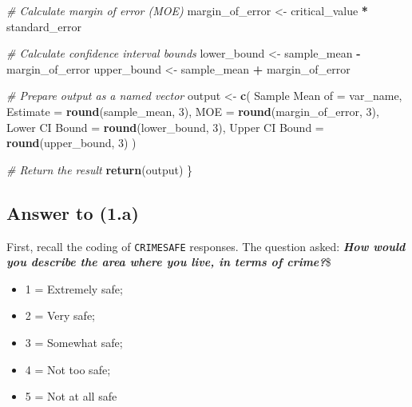 \documentclass[
  11pt,
]{article}
\newenvironment{Shaded}{\begin{snugshade}}{\end{snugshade}}
\newcommand{\AttributeTok}[1]{\textcolor[rgb]{0.13,0.29,0.53}{#1}}
\newcommand{\CommentTok}[1]{\textcolor[rgb]{0.56,0.35,0.01}{\textit{#1}}}
\newcommand{\DecValTok}[1]{\textcolor[rgb]{0.00,0.00,0.81}{#1}}
\newcommand{\FunctionTok}[1]{\textcolor[rgb]{0.13,0.29,0.53}{\textbf{#1}}}
\newcommand{\NormalTok}[1]{#1}
\newcommand{\OtherTok}[1]{\textcolor[rgb]{0.56,0.35,0.01}{#1}}
\newcommand{\SpecialCharTok}[1]{\textcolor[rgb]{0.81,0.36,0.00}{\textbf{#1}}}
\newcommand{\StringTok}[1]{\textcolor[rgb]{0.31,0.60,0.02}{#1}}
\providecommand{\tightlist}{%
  \setlength{\itemsep}{0pt}\setlength{\parskip}{0pt}}
\begin{document}
\begin{Shaded}
\begin{Highlighting}[]
  \CommentTok{\# Calculate margin of error (MOE)}
\NormalTok{  margin\_of\_error }\OtherTok{\textless{}{-}}\NormalTok{ critical\_value }\SpecialCharTok{*}\NormalTok{ standard\_error}
  
  \CommentTok{\# Calculate confidence interval bounds}
\NormalTok{  lower\_bound }\OtherTok{\textless{}{-}}\NormalTok{ sample\_mean }\SpecialCharTok{{-}}\NormalTok{ margin\_of\_error}
\NormalTok{  upper\_bound }\OtherTok{\textless{}{-}}\NormalTok{ sample\_mean }\SpecialCharTok{+}\NormalTok{ margin\_of\_error}
  
  \CommentTok{\# Prepare output as a named vector}
\NormalTok{  output }\OtherTok{\textless{}{-}} \FunctionTok{c}\NormalTok{(}
    \StringTok{\textasciigrave{}}\AttributeTok{Sample Mean of}\StringTok{\textasciigrave{}} \OtherTok{=}\NormalTok{ var\_name,}
    \AttributeTok{Estimate =} \FunctionTok{round}\NormalTok{(sample\_mean, }\DecValTok{3}\NormalTok{),}
    \AttributeTok{MOE =} \FunctionTok{round}\NormalTok{(margin\_of\_error, }\DecValTok{3}\NormalTok{),}
    \StringTok{\textasciigrave{}}\AttributeTok{Lower CI Bound}\StringTok{\textasciigrave{}} \OtherTok{=} \FunctionTok{round}\NormalTok{(lower\_bound, }\DecValTok{3}\NormalTok{),}
    \StringTok{\textasciigrave{}}\AttributeTok{Upper CI Bound}\StringTok{\textasciigrave{}} \OtherTok{=} \FunctionTok{round}\NormalTok{(upper\_bound, }\DecValTok{3}\NormalTok{)}
\NormalTok{  )}

  \CommentTok{\# Return the result}
  \FunctionTok{return}\NormalTok{(output)}
\NormalTok{\}}
\end{Highlighting}
\end{Shaded}

\subsection{Answer to (1.a)}\label{answer-to-1.a}

First, recall the coding of \texttt{CRIMESAFE} responses. The question
asked: \textbf{\emph{How would you describe the area where you live, in
terms of crime?}}\$

\begin{itemize}
\tightlist
\item
  1 = Extremely safe;
\item
  2 = Very safe;
\item
  3 = Somewhat safe;
\item
  4 = Not too safe;
\item
  5 = Not at all safe
\end{itemize}
\end{document}
